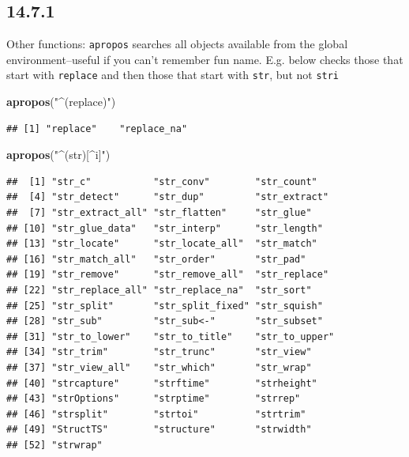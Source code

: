 \documentclass[]{book}
\newenvironment{Shaded}{\begin{snugshade}}{\end{snugshade}}
\newcommand{\KeywordTok}[1]{\textcolor[rgb]{0.13,0.29,0.53}{\textbf{#1}}}
\newcommand{\NormalTok}[1]{#1}
\newcommand{\StringTok}[1]{\textcolor[rgb]{0.31,0.60,0.02}{#1}}
\theoremstyle{definition}
\theoremstyle{definition}
\theoremstyle{definition}
\theoremstyle{remark}
\begin{document}
\hypertarget{section-52}{%
\subsection{14.7.1}\label{section-52}}

Other functions: \texttt{apropos} searches all objects available from
the global environment--useful if you can't remember fun name. E.g.
below checks those that start with \texttt{replace} and then those that
start with \texttt{str}, but not \texttt{stri}

\begin{Shaded}
\begin{Highlighting}[]
\KeywordTok{apropos}\NormalTok{(}\StringTok{"^(replace)"}\NormalTok{)}
\end{Highlighting}
\end{Shaded}

\begin{verbatim}
## [1] "replace"    "replace_na"
\end{verbatim}

\begin{Shaded}
\begin{Highlighting}[]
\KeywordTok{apropos}\NormalTok{(}\StringTok{"^(str)[^i]"}\NormalTok{)}
\end{Highlighting}
\end{Shaded}

\begin{verbatim}
##  [1] "str_c"           "str_conv"        "str_count"      
##  [4] "str_detect"      "str_dup"         "str_extract"    
##  [7] "str_extract_all" "str_flatten"     "str_glue"       
## [10] "str_glue_data"   "str_interp"      "str_length"     
## [13] "str_locate"      "str_locate_all"  "str_match"      
## [16] "str_match_all"   "str_order"       "str_pad"        
## [19] "str_remove"      "str_remove_all"  "str_replace"    
## [22] "str_replace_all" "str_replace_na"  "str_sort"       
## [25] "str_split"       "str_split_fixed" "str_squish"     
## [28] "str_sub"         "str_sub<-"       "str_subset"     
## [31] "str_to_lower"    "str_to_title"    "str_to_upper"   
## [34] "str_trim"        "str_trunc"       "str_view"       
## [37] "str_view_all"    "str_which"       "str_wrap"       
## [40] "strcapture"      "strftime"        "strheight"      
## [43] "strOptions"      "strptime"        "strrep"         
## [46] "strsplit"        "strtoi"          "strtrim"        
## [49] "StructTS"        "structure"       "strwidth"       
## [52] "strwrap"
\end{verbatim}
\end{document}

